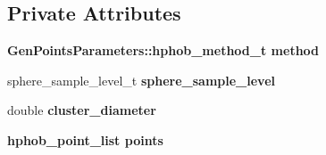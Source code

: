 \subsection*{Private Attributes}
\begin{CompactItemize}
\item 
\bf{Gen\-Points\-Parameters::hphob\_\-method\_\-t} \textbf{method}\label{classSimSite3D_1_1HphobPoints_11e6f8bf6d7faea419a39d6621f92326}

\item 
sphere\_\-sample\_\-level\_\-t \textbf{sphere\_\-sample\_\-level}\label{classSimSite3D_1_1HphobPoints_4ff1dda43958356e4730427317c5da34}

\item 
double \textbf{cluster\_\-diameter}\label{classSimSite3D_1_1HphobPoints_888ec8caee69ebb771ec15f155da32cc}

\item 
\bf{hphob\_\-point\_\-list} \textbf{points}\label{classSimSite3D_1_1HphobPoints_1c0b6a46ce1914e4d1e6778d6fbb04ad}

\end{CompactItemize}
